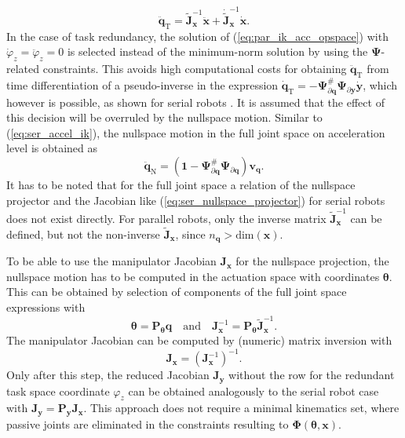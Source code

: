 \documentclass[a4paper,twoside]{article}
\begin{document}
\begin{equation}
\ddot{\bm{q}}_{\mathrm{T}}=\tilde{\bm{J}}_{\bm{x}}^{-1}\ddot{\bm{x}}+\dot{\tilde{\bm{J}}}_{\bm{x}}^{-1}\dot{\bm{x}}.
\label{eq:par_ik_acc_opspace}
\end{equation}
In the case of task redundancy, the solution of (\ref{eq:par_ik_acc_opspace}) with $\dot{\varphi}_z{=}\ddot{\varphi}_z{=}0$ is selected instead of the minimum-norm solution by using the $\bm{\Psi}$-related constraints.
This avoids high computational costs for obtaining $\ddot{\bm{q}}_\mathrm{T}$ from time differentiation of a pseudo-inverse in the expression $\dot{\bm{q}}_{\mathrm{T}}=-\bm{\Psi}_{\partial \bm{q}}^{\#} \bm{\Psi}_{\partial \bm{y}}\dot{\bm{y}}$, which however is possible, as shown for serial robots \cite{ReiterMueGat2018}.
It is assumed that the effect of this decision will be overruled by the nullspace motion.
%
Similar to (\ref{eq:ser_accel_ik}), the nullspace motion in the full joint space on acceleration level is obtained as
\begin{equation}
\ddot{\bm{q}}_{\mathrm{N}}=(\bm{1}-\bm{\Psi}_{\partial \bm{q}}^{\#}\bm{\Psi}_{\partial \bm{q}}) \bm{v}_{\bm{q}}.
\label{eq:par_nullspace_fulljoint}
\end{equation}
It has to be noted that for the full joint space a relation of the nullspace projector and the Jacobian like (\ref{eq:ser_nullspace_projector}) for serial robots does not exist directly. 
For parallel robots, only the inverse matrix $\tilde{\bm{J}}_{\bm{x}}^{-1}$ can be defined, but not the non-inverse $\tilde{\bm{J}}_{\bm{x}}$, since $n_{\bm{q}}>\mathrm{dim}(\bm{x})$.

To be able to use the manipulator Jacobian $\bm{J}_{\bm{x}}$ for the nullspace projection, the nullspace motion has to be computed in the actuation space with coordinates $\bm{\theta}$.
This can be obtained by selection of components of the full joint space expressions with
%
\begin{equation}
\bm{\theta} = \bm{P}_{\bm{\theta}} \bm{q}
\quad \mathrm{and} \quad
\bm{J}_{\bm{x}}^{-1}=\bm{P}_{\bm{\theta}} \tilde{\bm{J}}_{\bm{x}}^{-1}.
\label{eq:parrob_jacobian}
\end{equation}
%
The manipulator Jacobian can be computed by (numeric) matrix inversion with
%
\begin{equation}
\bm{J}_{\bm{x}} = (\bm{J}_{\bm{x}}^{-1})^{-1}.
\label{eq:par_jacobi_inv}
\end{equation}
%
Only after this step, the reduced Jacobian $\bm{J}_{\bm{y}}$ without the row for the redundant task space coordinate $\varphi_z$ can be obtained analogously to the serial robot case with
$\bm{J}_{\bm{y}} = \bm{P}_{\bm{y}} \bm{J}_{\bm{x}}$.
%
This approach does not require a minimal kinematics set, where passive joints are eliminated in the constraints resulting to $\bm{\Phi}(\bm{\theta},\bm{x})$.
\end{document}
